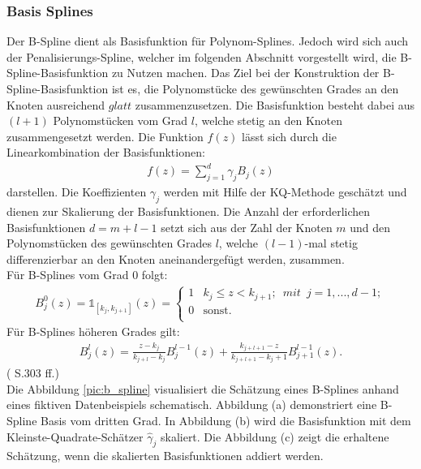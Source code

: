 \documentclass[12pt]{scrreprt}
\begin{document}
\subsubsection{Basis Splines}
Der B-Spline dient als Basisfunktion für Polynom-Splines. Jedoch wird sich auch der Penalisierungs-Spline, welcher im folgenden Abschnitt vorgestellt wird, die B-Spline-Basisfunktion zu Nutzen machen. Das Ziel bei der Konstruktion der B-Spline-Basisfunktion ist es, die Polynomstücke des gewünschten Grades an den Knoten ausreichend $glatt$ zusammenzusetzen. Die Basisfunktion besteht dabei aus $(l+1)$ Polynomstücken vom Grad $l$, welche stetig an den Knoten zusammengesetzt werden. Die Funktion $f(z)$ lässt sich durch die Linearkombination der Basisfunktionen:
\begin{align}
f(z)=\sum_{j=1}^d\gamma_{j}B_{j}(z)
\end{align}
darstellen. Die Koeffizienten  $\gamma_{j}$ werden mit Hilfe der KQ-Methode geschätzt und dienen zur Skalierung der Basisfunktionen. Die Anzahl der erforderlichen Basisfunktionen $d = m+l-1$ setzt sich aus der Zahl der Knoten $m$ und den Polynomstücken des gewünschten Grades $l$, welche $(l-1)$-mal stetig differenzierbar an den Knoten aneinandergefügt werden, zusammen.  \\
Für B-Splines vom Grad 0 folgt:
\begin{align}
B_{j}^0(z)= \mathbb{1}_{[k_{j},k_{j+1}]}(z)= 
\begin{cases}
1 & k_{j} \leq z<k_{j+1};\enspace mit\enspace j=1,...,d-1; \\
0 & \text{sonst.} \\
\end{cases}
\end{align}
Für B-Splines höheren Grades gilt:
\begin{align}
B_{j}^l(z)= \frac{z-k_{j}}{k_{j+l}-k_{j}}B_{j}^{l-1}(z)+
\frac{k_{j+l+1}-z}{k_{j+l+1}-k_j+1}B_{j+1}^{l-1}(z).
\end{align}
(\cite{fahrmeir2007regression} S.303 ff.) \\
Die Abbildung \ref{pic:b_spline} visualisiert die Schätzung eines B-Splines anhand eines fiktiven Datenbeispiels schematisch. Abbildung (a) demonstriert eine B-Spline Basis vom dritten Grad. In Abbildung (b) wird die Basisfunktion mit dem Kleinste-Quadrate-Schätzer $\hat\gamma_{j}$ skaliert. Die Abbildung (c) zeigt die erhaltene Schätzung, wenn die skalierten Basisfunktionen addiert werden.
\end{document}
